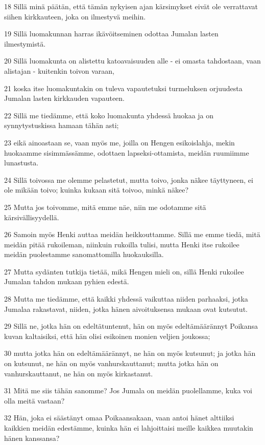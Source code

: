 \par 18 Sillä minä päätän, että tämän nykyisen ajan kärsimykset eivät ole verrattavat siihen kirkkauteen, joka on ilmestyvä meihin.
\par 19 Sillä luomakunnan harras ikävöitseminen odottaa Jumalan lasten ilmestymistä.
\par 20 Sillä luomakunta on alistettu katoavaisuuden alle - ei omasta tahdostaan, vaan alistajan - kuitenkin toivon varaan,
\par 21 koska itse luomakuntakin on tuleva vapautetuksi turmeluksen orjuudesta Jumalan lasten kirkkauden vapauteen.
\par 22 Sillä me tiedämme, että koko luomakunta yhdessä huokaa ja on synnytystuskissa hamaan tähän asti;
\par 23 eikä ainoastaan se, vaan myös me, joilla on Hengen esikoislahja, mekin huokaamme sisimmässämme, odottaen lapseksi-ottamista, meidän ruumiimme lunastusta.
\par 24 Sillä toivossa me olemme pelastetut, mutta toivo, jonka näkee täyttyneen, ei ole mikään toivo; kuinka kukaan sitä toivoo, minkä näkee?
\par 25 Mutta jos toivomme, mitä emme näe, niin me odotamme sitä kärsivällisyydellä.
\par 26 Samoin myös Henki auttaa meidän heikkouttamme. Sillä me emme tiedä, mitä meidän pitää rukoileman, niinkuin rukoilla tulisi, mutta Henki itse rukoilee meidän puolestamme sanomattomilla huokauksilla.
\par 27 Mutta sydänten tutkija tietää, mikä Hengen mieli on, sillä Henki rukoilee Jumalan tahdon mukaan pyhien edestä.
\par 28 Mutta me tiedämme, että kaikki yhdessä vaikuttaa niiden parhaaksi, jotka Jumalaa rakastavat, niiden, jotka hänen aivoituksensa mukaan ovat kutsutut.
\par 29 Sillä ne, jotka hän on edeltätuntenut, hän on myös edeltämäärännyt Poikansa kuvan kaltaisiksi, että hän olisi esikoinen monien veljien joukossa;
\par 30 mutta jotka hän on edeltämäärännyt, ne hän on myös kutsunut; ja jotka hän on kutsunut, ne hän on myös vanhurskauttanut; mutta jotka hän on vanhurskauttanut, ne hän on myös kirkastanut.
\par 31 Mitä me siis tähän sanomme? Jos Jumala on meidän puolellamme, kuka voi olla meitä vastaan?
\par 32 Hän, joka ei säästänyt omaa Poikaansakaan, vaan antoi hänet alttiiksi kaikkien meidän edestämme, kuinka hän ei lahjoittaisi meille kaikkea muutakin hänen kanssansa?
